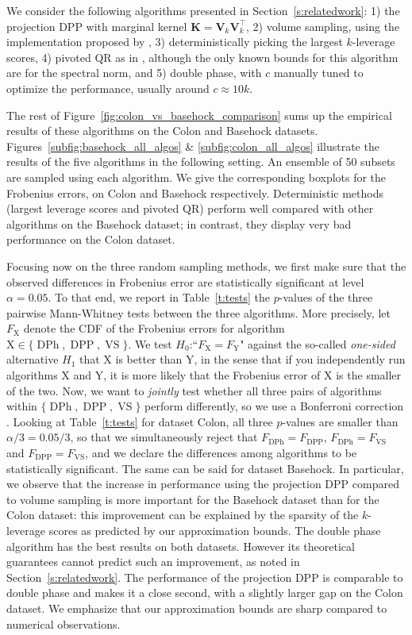 \documentclass[twoside,11pt]{book}
\numberwithin{theorem}{chapter}
\numberwithin{definition}{chapter}
\numberwithin{proposition}{chapter}
\numberwithin{corollary}{chapter}
\numberwithin{example}{chapter}
\numberwithin{lemma}{chapter}
\DeclareMathOperator{\DPP}{\mathrm{DPP}}
\DeclareMathOperator{\VS}{\mathrm{VS}}
\DeclareMathOperator{\Tran}{\intercal}
\DeclareMathOperator{\DPh}{\mathrm{DPh}}
\begin{document}
We consider the following algorithms presented in Section~\ref{s:relatedwork}: 1) the projection DPP with marginal kernel $\bm{K}=\bm{V}_{k}^{}\bm{V}_{k}^{\Tran}$, 2) volume sampling, using the implementation proposed by \cite{KuTa11}, 3) deterministically picking the largest $k$-leverage scores, 4) pivoted QR as in \cite{Golu65}, although the only known bounds for this algorithm are for the spectral norm, and 5) double phase, with $c$ manually tuned to optimize the performance, usually around $c \approx 10k$.

The rest of Figure~\ref{fig:colon_vs_basehock_comparison} sums up the empirical results of these algorithms on the Colon and Basehock datasets.
%
Figures~\ref{subfig:basehock_all_algos} \& \ref{subfig:colon_all_algos} illustrate the results of the five algorithms in the following setting. An ensemble of 50 subsets are sampled using each algorithm. We give the corresponding boxplots for the Frobenius errors, on Colon and Basehock respectively.
%
Deterministic methods (largest leverage scores and pivoted QR) perform well compared with other algorithms on the Basehock dataset; in contrast, they display very bad performance on the Colon dataset.

Focusing now on the three random sampling methods, we first make sure that the observed differences in Frobenius error are statistically significant at level $\alpha=0.05$. To that end, we report in Table~\ref{t:tests} the $p$-values of the three pairwise Mann-Whitney tests between the three algorithms. More precisely, let $F_\text{X}$ denote the CDF of the Frobenius errors for algorithm $\text{X}\in\{\DPh,\DPP,\VS\}$. We test $H_0$:``$F_\text{X}=F_\text{Y}$" against the so-called \emph{one-sided} alternative $H_1$ that X is better than Y, in the sense that if you independently run algorithms X and Y, it is more likely that the Frobenius error of X is the smaller of the two. Now, we want to \emph{jointly} test whether all three pairs of algorithms within $\{\DPh,\DPP,\VS\}$ perform differently, so we use a Bonferroni correction \citep{Was13}. Looking at Table~\ref{t:tests} for dataset Colon, all three $p$-values are smaller than $\alpha/3=0.05/3$, so that we simultaneously reject that $F_{\DPh}=F_{\DPP}$, $F_{\DPh}=F_{\VS}$ and $F_{\DPP}=F_{\VS}$, and we declare the differences among algorithms to be statistically significant. The same can be said for dataset Basehock. In particular, we observe that the increase in performance using the projection DPP compared to volume sampling is more important for the Basehock dataset than for the Colon dataset: this improvement can be explained by the sparsity of the $k$-leverage scores as predicted by our approximation bounds.
%
The double phase algorithm has the best results on both datasets. However its theoretical guarantees cannot predict such an improvement, as noted in Section~\ref{s:relatedwork}. The performance of the projection DPP is comparable to double phase and makes it a close second, with a slightly larger gap on the Colon dataset. We emphasize that our approximation bounds are sharp compared to numerical observations.
\end{document}
